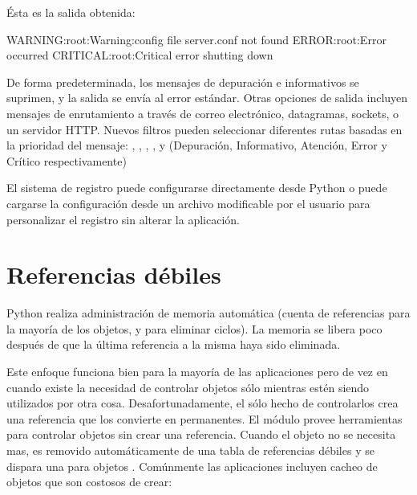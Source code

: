 \documentclass[a4,10pt,spanish]{sphinxmanual}
\begin{document}
\sphinxAtStartPar
Ésta es la salida obtenida:

\begin{sphinxVerbatim}[commandchars=\\\{\}]
WARNING:root:Warning:config file server.conf not found
ERROR:root:Error occurred
CRITICAL:root:Critical error \PYGZhy{}\PYGZhy{} shutting down
\end{sphinxVerbatim}

\sphinxAtStartPar
De forma predeterminada, los mensajes de depuración e informativos se suprimen, y la salida se envía al error estándar.  Otras opciones de salida incluyen mensajes de enrutamiento a través de correo electrónico, datagramas, sockets, o un servidor HTTP.  Nuevos filtros pueden seleccionar diferentes rutas basadas en la prioridad del mensaje: , , , , y  (Depuración, Informativo, Atención, Error y Crítico respectivamente)

\sphinxAtStartPar
El sistema de registro puede configurarse directamente desde Python o puede cargarse la configuración desde un archivo modificable por el usuario para personalizar el registro sin alterar la aplicación.


\section{Referencias débiles}
\label{\detokenize{tutorial/stdlib2:weak-references}}\label{\detokenize{tutorial/stdlib2:tut-weak-references}}
\sphinxAtStartPar
Python realiza administración de memoria automática (cuenta de referencias para la mayoría de los objetos, y {\hyperref[\detokenize{glossary:term-garbage-collection}]{}} para eliminar ciclos).  La memoria se libera poco después de que la última referencia a la misma haya sido eliminada.

\sphinxAtStartPar
Este enfoque funciona bien para la mayoría de las aplicaciones pero de vez en cuando existe la necesidad de controlar objetos sólo mientras estén siendo utilizados por otra cosa. Desafortunadamente, el sólo hecho de controlarlos crea una referencia que los convierte en permanentes. El módulo  provee herramientas para controlar objetos sin crear una referencia. Cuando el objeto no se necesita mas, es removido automáticamente de una tabla de referencias débiles y se dispara una  para objetos . Comúnmente las aplicaciones incluyen cacheo de objetos que son costosos de crear:
\end{document}

